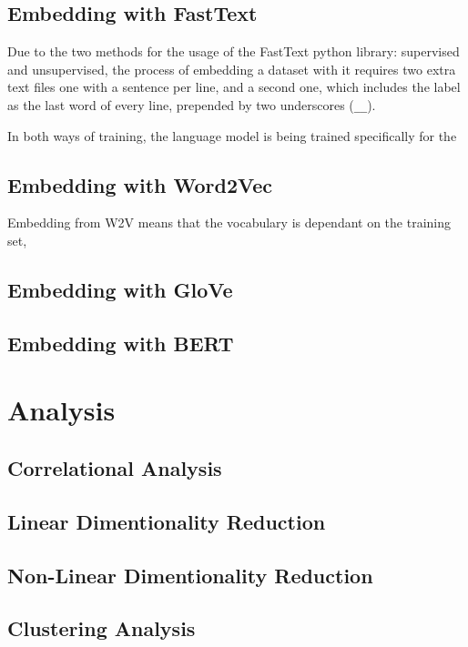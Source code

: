 \subsection{Embedding with FastText}\label{sub:Embedding with FastText}
Due to the two methods for the usage of the FastText python library: supervised and unsupervised, the process of embedding a dataset with it requires two extra text files one with a sentence per line, and a second one, which includes the label as the last word of every line, prepended by two underscores (\lstinline{__}).

In both ways of training, the language model is being trained specifically for the

\subsection{Embedding with Word2Vec}\label{sub:Embedding with Word2Vec}
Embedding from W2V means that the vocabulary is dependant on the training set,


\subsection{Embedding with GloVe}\label{sub:Embedding with GloVe}
\subsection{Embedding with BERT}\label{sub:Embedding with BERT}

\section{Analysis}\label{sec:Analysis}
\subsection{Correlational Analysis}\label{sub:Correlational Analysis}
\subsection{Linear Dimentionality Reduction}\label{sub:Linear Dimentionality Reduction}
\subsection{Non-Linear Dimentionality Reduction}\label{sub:Non-Linear Dimentionality Reduction}
\subsection{Clustering Analysis}\label{sub:Clustering Analysis}


